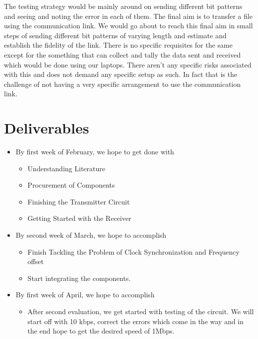 \documentclass{article}
\begin{document}
The testing strategy would be mainly around on sending different bit patterns and seeing and noting the error in each of them. The final aim is to transfer a file using the communication link. We would go about to reach this final aim in small steps of sending different bit patterns of varying length and estimate and establish the fidelity of the link. There is no specific requisites for the same except for the something that can collect and tally the data sent and received which would be done using our laptops. There aren’t any specific risks associated with this and does not demand any specific setup as such. In fact that is the challenge of not having a very specific arrangement to use the communication link. 
\section{Deliverables}

\begin{itemize}
\item By first week of February, we hope to get done with
  \begin{itemize}
  \item Understanding Literature
  \item Procurement of Components
  \item Finishing the Transmitter Circuit
  \item Getting Started with the Receiver 
  \end{itemize}

\item By second week of March, we hope to accomplish

  \begin{itemize}
  \item Finish Tackling the Problem of Clock Synchronization and Frequency offset
  \item Start integrating the components.
  \end{itemize}

\item By first week of April, we hope to accomplish
  \begin{itemize}
  \item After second evaluation, we get started with testing of the circuit. We will start off with 10 kbps, correct the errors which come in the way and in the end   hope to get the desired speed of 1Mbps. 
  \end{itemize}
\end{itemize}
\end{document}

